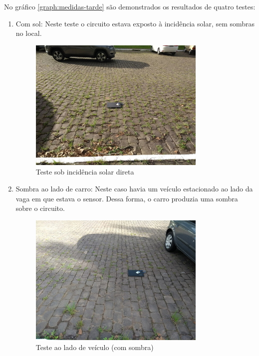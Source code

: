 \documentclass[oneside,openright,12pt]{ufsm_2015} %
\begin{document}
    No gráfico \ref{graph:medidas-tarde} são demonstrados os resultados de quatro testes: 
    \begin{enumerate}
        \item Com sol: Neste teste o circuito estava exposto à incidência solar, sem sombras no local. 
        \begin{figure}[ht]
     	    \caption{\label{exepretex} Teste sob incidência solar direta}
            \centering
            \includegraphics[width=0.8\textwidth]{figuras/teste4.png}
            \vspace{\baselineskip} %
        \end{figure}
        
        \item Sombra ao lado de carro: Neste caso havia um veículo estacionado ao lado da vaga em que estava o sensor. Dessa forma, o carro produzia uma sombra sobre o circuito.
        
        \begin{figure}[ht]
     	    \caption{\label{exepretex} Teste ao lado de veículo (com sombra)}
            \centering
            \includegraphics[width=0.8\textwidth]{figuras/teste5.jpg}
            \vspace{\baselineskip} %
        \end{figure}
        

\end{enumerate}
\end{document}
